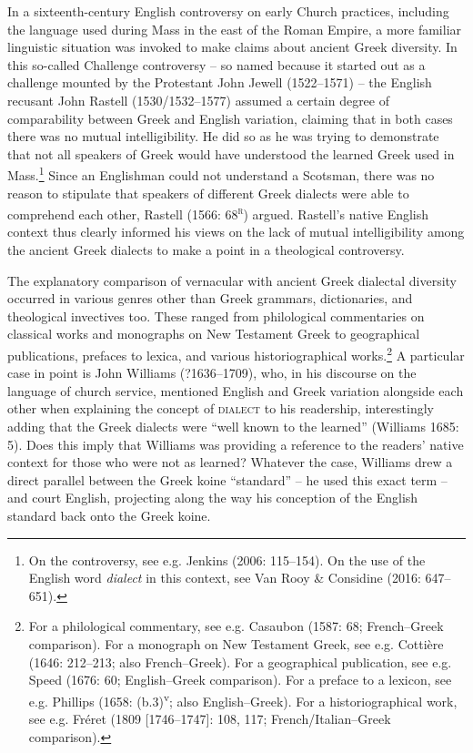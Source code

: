 \documentclass[12pt]{article}
\newenvironment{styleStandard}{\renewcommand\baselinestretch{1.25}\setlength\leftskip{0in}\setlength\rightskip{0in}\setlength\parindent{0.1972in}\setlength\parfillskip{0pt plus 1fil}\setlength\parskip{0in plus 1pt}\writerlistparindent\writerlistleftskip\leavevmode\normalfont\normalsize\writerlistlabel\ignorespaces}{\unskip\vspace{0in plus 1pt}\par}
\newcommand\writerlistleftskip{}
\newcommand\writerlistparindent{}
\newcommand\writerlistlabel{}
\begin{document}
\begin{styleStandard}
In a sixteenth-century English controversy on early Church practices, including the language used during Mass in the east of the Roman Empire, a more familiar linguistic situation was invoked to make claims about ancient Greek diversity. In this so-called Challenge controversy – so named because it started out as a challenge mounted by the Protestant John Jewell (1522–1571) – the English recusant John Rastell (1530/1532–1577) assumed a certain degree of comparability between Greek and English variation, claiming that in both cases there was no mutual intelligibility. He did so as he was trying to demonstrate that not all speakers of Greek would have understood the learned Greek used in Mass.\footnote{ On the controversy, see e.g. Jenkins (2006: 115–154). On the use of the English word \textit{dialect} in this context, see Van Rooy \& Considine (2016: 647–651).} Since an Englishman could not understand a Scotsman, there was no reason to stipulate that speakers of different Greek dialects were able to comprehend each other, Rastell (1566: 68\textsc{\textsuperscript{r}}) argued. Rastell’s native English context thus clearly informed his views on the lack of mutual intelligibility among the ancient Greek dialects to make a point in a theological controversy.
\end{styleStandard}

\begin{styleStandard}
The explanatory comparison of vernacular with ancient Greek dialectal diversity occurred in various genres other than Greek grammars, dictionaries, and theological invectives too. These ranged from philological commentaries on classical works and monographs on New Testament Greek to geographical publications, prefaces to lexica, and various historiographical works.\footnote{ For a philological commentary, see e.g. Casaubon (1587: 68; French–Greek comparison). For a monograph on New Testament Greek, see e.g. Cottière (1646: 212–213; also French–Greek). For a geographical publication, see e.g. Speed (1676: 60; English–Greek comparison). For a preface to a lexicon, see e.g. Phillips (1658: (b.3)\textsuperscript{v}\textsc{;} also English–Greek). For a historiographical work, see e.g. Fréret (1809 [1746–1747]: 108, 117; French/Italian–Greek comparison).} A particular case in point is John Williams (?1636–1709), who, in his discourse on the language of church service, mentioned English and Greek variation alongside each other when explaining the concept of \textsc{dialect} to his readership, interestingly adding that the Greek dialects were “well known to the learned” (Williams 1685: 5). Does this imply that Williams was providing a reference to the readers’ native context for those who were not as learned? Whatever the case, Williams drew a direct parallel between the Greek koine “standard” – he used this exact term – and court English, projecting along the way his conception of the English standard back onto the Greek koine.
\end{styleStandard}
\end{document}
